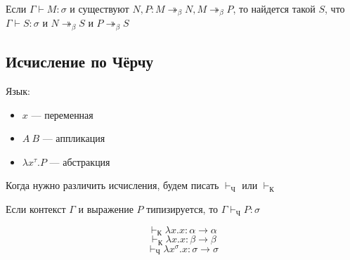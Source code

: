 \begin{theorem}
    Если \(\Gamma \vdash M : \sigma\) и существуют \(N, P : M \twoheadrightarrow_\beta N, M \twoheadrightarrow_\beta P\), то найдется такой \(S\), что \(\Gamma \vdash S : \sigma\) и \(N \twoheadrightarrow_\beta S\) и \(P \twoheadrightarrow_\beta S\)
\end{theorem}

\subsection{Исчисление по Чёрчу}

Язык:
\begin{itemize}
    \item \(x\) --- переменная
    \item \(A\ B\) --- аппликация
    \item \(\lambda x^\tau.P\) --- абстракция
\end{itemize}

\begin{notation}
    Когда нужно различить исчисления, будем писать \( \vdash_{\mathrm{Ч}}\) или \( \vdash_{\mathrm{К}}\)
\end{notation}

\begin{theorem}
    Если контекст \(\Gamma\) и выражение \(P\) типизируется, то \(\Gamma \vdash_{\mathrm{Ч}} P : \sigma\)
\end{theorem}

\begin{example}
    \[ \vdash_{\mathrm{К}} \lambda x.x : \alpha \to \alpha\]
    \[ \vdash_{\mathrm{К}} \lambda x.x : \beta \to \beta\]
    \[ \vdash_{\mathrm{Ч}} \lambda x^\sigma.x : \sigma \to \sigma\]
\end{example}
